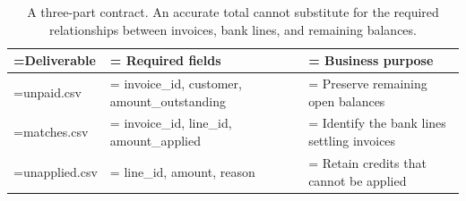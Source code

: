 \begin{table}[!htbp]
\centering\small
\setlength{\tabcolsep}{4pt}
\begin{tabularx}{\linewidth}{@{}>{\hsize=0.62\hsize\linewidth=\hsize\RaggedRight\arraybackslash}X>{\hsize=1.12\hsize\linewidth=\hsize\RaggedRight\arraybackslash}X>{\hsize=1.26\hsize\linewidth=\hsize\RaggedRight\arraybackslash}X@{}}
\toprule
\textbf{Deliverable} & \textbf{Required fields} & \textbf{Business purpose} \\
\midrule
unpaid.csv & invoice\_id, customer, amount\_outstanding & Preserve remaining open balances \\
matches.csv & invoice\_id, line\_id, amount\_applied & Identify the bank lines settling invoices \\
unapplied.csv & line\_id, amount, reason & Retain credits that cannot be applied \\
\bottomrule
\end{tabularx}
\caption{A three-part contract. An accurate total cannot substitute for the required relationships between invoices, bank lines, and remaining balances.}
\label{tab:6}
\end{table}
